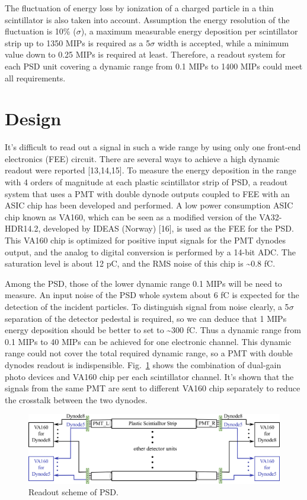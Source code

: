 \documentclass[5p, times]{elsarticle}
\begin{document}
The fluctuation of energy loss by ionization of a charged particle in a thin scintillator is also taken into account.
Assumption the energy resolution of the fluctuation is 10\% ($\sigma $), a maximum measurable energy deposition per
scintillator strip up to 1350 MIPs is required as a 5$\sigma $ width is accepted, while a minimum value down to 0.25
MIPs is required at least. Therefore, a readout system for each PSD unit covering a dynamic range from 0.1 MIPs to 1400
MIPs could meet all requirements.


\section{Design}
\label{sec:design}

It’s difficult to read out a signal in such a wide range by using only one front-end electronics (FEE) circuit. There
are several ways to achieve a high dynamic readout were reported [13,14,15]. To measure the energy deposition in the
range with 4 orders of magnitude at each plastic scintillator strip of PSD, a readout system that uses a PMT with
double dynode outputs coupled to FEE with an ASIC chip has been developed and performed. A low power consumption ASIC
chip known as VA160, which can be seen as a modified version of the VA32-HDR14.2, developed by IDEAS (Norway) [16], is
used as the FEE for the PSD. This VA160 chip is optimized for positive input signals for the PMT dynodes output, and
the analog to digital conversion is performed by a 14-bit ADC. The saturation level is about 12 pC, and the RMS noise
of this chip is \~{}0.8 fC.

Among the PSD, those of the lower dynamic range 0.1 MIPs will be need to measure. An input noise of the PSD whole system
about 6 fC is expected for the detection of the incident particles. To distinguish signal from noise clearly, a
5$\sigma $ separation of the detector pedestal is required, so we can deduce that 1 MIPs energy deposition should be
better to set to \~{}300 fC. Thus a dynamic range from 0.1 MIPs to 40 MIPs can be achieved for one electronic channel.
This dynamic range could not cover the total required dynamic range, so a PMT with double dynodes readout is
indispensible. Fig.~\ref{fig:readout_scheme} shows the combination of dual-gain photo devices and VA160 chip per each scintillator channel.
It’s shown that the signals from the same PMT are sent to different VA160 chip separately to reduce the crosstalk
between the two dynodes.

\begin{figure}
\centering
 \includegraphics[width=140mm]{readout_scheme}
\caption{Readout scheme of PSD.}
\label{fig:readout_scheme}
\end{figure} 
\end{document}

